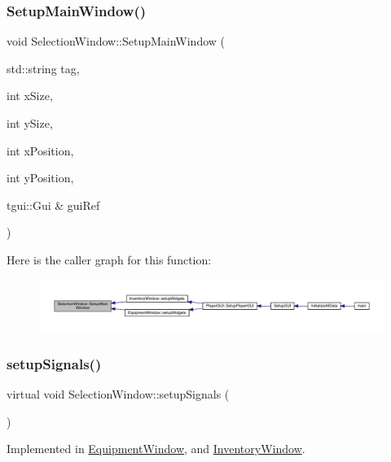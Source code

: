 \subsubsection{\texorpdfstring{Setup\+Main\+Window()}{SetupMainWindow()}}
{\footnotesize\ttfamily void Selection\+Window\+::\+Setup\+Main\+Window (\begin{DoxyParamCaption}\item[{std\+::string}]{tag,  }\item[{int}]{x\+Size,  }\item[{int}]{y\+Size,  }\item[{int}]{x\+Position,  }\item[{int}]{y\+Position,  }\item[{tgui\+::\+Gui \&}]{gui\+Ref }\end{DoxyParamCaption})}

Here is the caller graph for this function\+:
\nopagebreak
\begin{figure}[H]
\begin{center}
\leavevmode
\includegraphics[width=350pt]{db/d9c/class_selection_window_a114554837c81ec32275741764bfccdc0_icgraph}
\end{center}
\end{figure}
\mbox{\label{class_selection_window_a912063c60bb6c7899422b5d470bcf64e}} 
\subsubsection{\texorpdfstring{setup\+Signals()}{setupSignals()}}
{\footnotesize\ttfamily virtual void Selection\+Window\+::setup\+Signals (\begin{DoxyParamCaption}{ }\end{DoxyParamCaption})\hspace{0.3cm}{\ttfamily [pure virtual]}}



Implemented in \mbox{\hyperlink{class_equipment_window_ae0c437e74fb9e01a5fb0423df76e4665}{Equipment\+Window}}, and \mbox{\hyperlink{class_inventory_window_ada117b35239727b734887c1d56dcf6f0}{Inventory\+Window}}.

